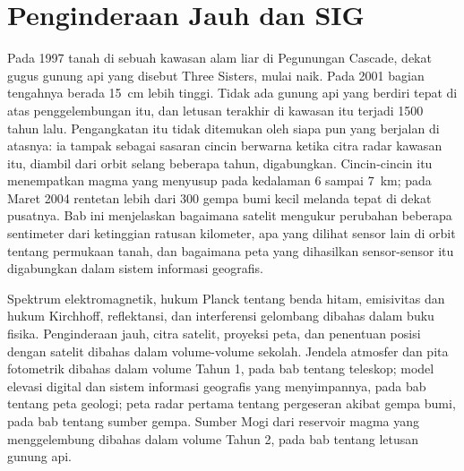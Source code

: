 \chapter{Penginderaan Jauh dan SIG}\label{ch:b3:remote-sensing-gis}

Pada 1997 tanah di sebuah kawasan alam liar di Pegunungan Cascade, dekat gugus
gunung api yang disebut Three Sisters, mulai naik. Pada 2001 bagian tengahnya berada
\qty{15}{cm} lebih tinggi. Tidak ada gunung api yang berdiri tepat di atas penggelembungan itu, dan
letusan terakhir di kawasan itu terjadi 1500 tahun lalu. Pengangkatan itu tidak
ditemukan oleh siapa pun yang berjalan di atasnya: ia tampak sebagai sasaran cincin berwarna ketika
citra radar kawasan itu, diambil dari orbit selang beberapa tahun, digabungkan.
Cincin-cincin itu menempatkan magma yang menyusup pada kedalaman 6 sampai \qty{7}{km}; pada Maret 2004
rentetan lebih dari 300 gempa bumi kecil melanda tepat di dekat pusatnya.
Bab ini menjelaskan bagaimana satelit mengukur perubahan beberapa sentimeter dari
ketinggian ratusan kilometer, apa yang dilihat sensor lain di orbit tentang permukaan
tanah, dan bagaimana peta yang dihasilkan sensor-sensor itu digabungkan
dalam sistem informasi geografis.

\begin{recall}
Spektrum elektromagnetik, hukum Planck tentang benda hitam, emisivitas
dan hukum Kirchhoff, reflektansi, dan interferensi gelombang dibahas dalam
buku fisika. Penginderaan jauh, citra satelit, proyeksi peta, dan
penentuan posisi dengan satelit dibahas dalam volume-volume sekolah. Jendela atmosfer dan
pita fotometrik dibahas dalam volume Tahun 1, pada bab tentang teleskop;
model elevasi digital dan sistem informasi geografis yang menyimpannya, pada
bab tentang peta geologi; peta radar pertama tentang pergeseran akibat
gempa bumi, pada bab tentang sumber gempa. Sumber Mogi dari reservoir magma
yang menggelembung dibahas dalam volume Tahun 2, pada
bab tentang letusan gunung api.
\end{recall}

